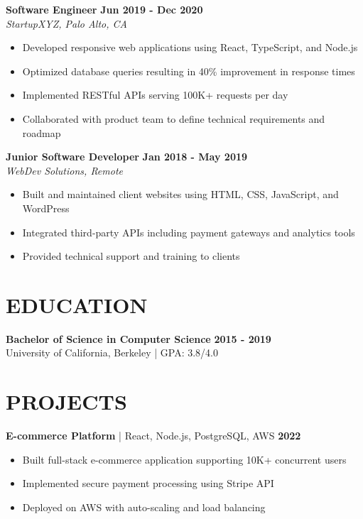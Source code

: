 \documentclass{article}
\begin{document}
\vspace{0.15cm}

\textbf{Software Engineer} \hfill \textbf{Jun 2019 - Dec 2020} \\
\textit{StartupXYZ, Palo Alto, CA}
\begin{itemize}[leftmargin=*, itemsep=0pt]
    \item Developed responsive web applications using React, TypeScript, and Node.js
    \item Optimized database queries resulting in 40\% improvement in response times
    \item Implemented RESTful APIs serving 100K+ requests per day
    \item Collaborated with product team to define technical requirements and roadmap
\end{itemize}

\vspace{0.15cm}

\textbf{Junior Software Developer} \hfill \textbf{Jan 2018 - May 2019} \\
\textit{WebDev Solutions, Remote}
\begin{itemize}[leftmargin=*, itemsep=0pt]
    \item Built and maintained client websites using HTML, CSS, JavaScript, and WordPress
    \item Integrated third-party APIs including payment gateways and analytics tools
    \item Provided technical support and training to clients
\end{itemize}

\vspace{0.2cm}

\section*{EDUCATION}
\textbf{Bachelor of Science in Computer Science} \hfill \textbf{2015 - 2019} \\
University of California, Berkeley | GPA: 3.8/4.0

\vspace{0.2cm}

\section*{PROJECTS}

\textbf{E-commerce Platform} | React, Node.js, PostgreSQL, AWS \hfill \textbf{2022}
\begin{itemize}[leftmargin=*, itemsep=0pt]
    \item Built full-stack e-commerce application supporting 10K+ concurrent users
    \item Implemented secure payment processing using Stripe API
    \item Deployed on AWS with auto-scaling and load balancing
\end{itemize}
\end{document}
